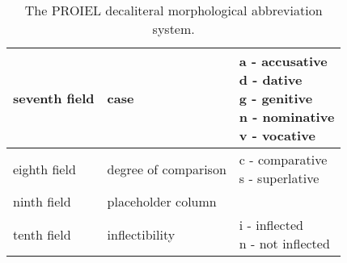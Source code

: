 \begin{table}
\begin{tabular}{|l|l|l|}
    seventh field & case & \specialcell{a - accusative\\d - dative\\g - genitive\\n - nominative\\v - vocative} \\ \hline
    eighth field & degree of comparison & \specialcell{c - comparative\\s - superlative} \\ \hline
    ninth field & placeholder column & \specialcell{-} \\ \hline
    tenth field & inflectibility & \specialcell{i - inflected\\n - not inflected} \\ \hline
    \hline
  \end{tabular}
  \caption{The PROIEL decaliteral morphological abbreviation system.} \label{table:proielmorph}
\end{table}

